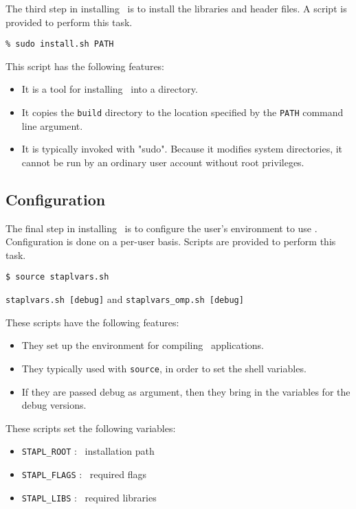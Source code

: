 \documentclass{report}
\begin{document}
The third step in installing \stapl\ is to install the libraries
and header files.  A script is provided to perform this task.

\begin{verbatim}
% sudo install.sh PATH
\end{verbatim}

This script has the following features:

\begin{itemize}
\item
It is a tool for installing \stapl\ into a directory.
\item
It copies the \texttt{build} directory to the location specified by the
\texttt{PATH} command line argument.
\item
It is typically invoked with "sudo".  Because it modifies system directories,
it cannot be run by an ordinary user account without root privileges.
\end{itemize}

\subsection{Configuration}

The final step in installing \stapl\ is to configure the user's environment
to use \stapl.  Configuration is done on a per-user basis.
Scripts are provided to perform this task.
	
\begin{verbatim}
$ source staplvars.sh
\end{verbatim}

\texttt{staplvars.sh [debug]} and \texttt{staplvars\_omp.sh [debug]}

These scripts have the following features:
\begin{itemize}
\item
They set up the environment for compiling \stapl\ applications.
\item
They typically used with \texttt{source}, in order to set the shell variables.
\item
If they are passed debug as argument, 
then they bring in the variables for the debug versions.
\end{itemize}

These scripts set the following variables:
\begin{itemize}
\item
\texttt{STAPL\_ROOT} : \stapl\ installation path
\item
\texttt{STAPL\_FLAGS} : \stapl\ required flags
\item
\texttt{STAPL\_LIBS} : \stapl\ required libraries
\end{itemize}
\end{document}
